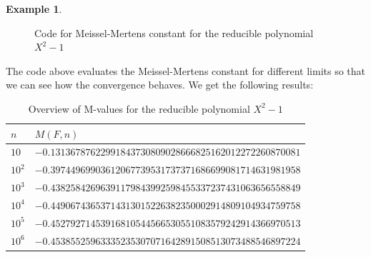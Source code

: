 \documentclass{article}
\theoremstyle{definition}
\newtheorem{example}{Example}[section]
\theoremstyle{remark}
\begin{document}
\begin{example}
\begin{figure}[H]
\caption{\label{fig: example4-1} Code for Meissel-Mertens constant for the reducible polynomial $X^2-1$}
\end{figure}
The code above evaluates the Meissel-Mertens constant for different limits so that we can see how the convergence  behaves. We get the following results:
\begin{table}[H]
\centering
\label{example4-1table}
\begin{tabular}{|l|l|}
\hline
$n$      & $M(F,n)$                                                  \\ \hline
$10$   & $-0.13136787622991843730809028666825162012272260870081$ \\ \hline
$10^2$ & $-0.39744969903612067739531737371686699081714631981958$ \\ \hline
$10^3$ & $-0.43825842696391179843992598455337237431063656558849$ \\ \hline
$10^4$ & $-0.44906743653714313015226382350002914809104934759758$ \\ \hline
$10^5$ & $-0.45279271453916810544566530551083579242914366970513$ \\ \hline
$10^6$ & $-0.45385525963335235307071642891508513073488546897224$ \\ \hline
\end{tabular}
\caption{Overview of M-values for the reducible polynomial $X^2-1$}
\end{table}

\end{example}
\end{document}
